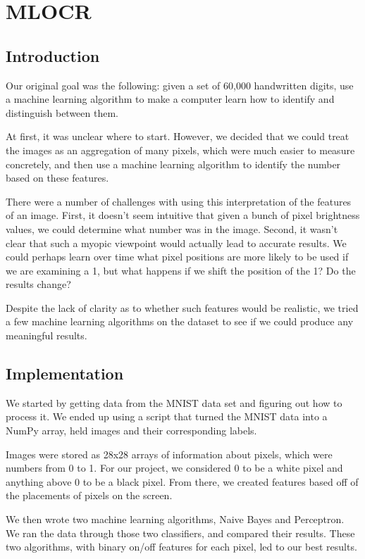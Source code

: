 \documentclass{article}
\theoremstyle{remark}
\begin{document}
	 \section*{MLOCR}
	\label*{Optical Character Recognition using Machine Learning}
	   \subsection*{Introduction}
     Our original goal was the following: given a set of 60,000 handwritten digits, use a machine learning algorithm to make a computer learn how to identify and distinguish between them.

     At first, it was unclear where to start. However, we decided that we could treat the images as an aggregation of many pixels, which were much easier to measure concretely, and then use a machine learning algorithm to identify the number based on these features.

     There were a number of challenges with using this interpretation of the features of an image. First, it doesn't seem intuitive that given a bunch of pixel brightness values, we could determine what number was in the image. Second, it wasn't clear that such a myopic viewpoint would actually lead to accurate results. We could perhaps learn over time what pixel positions are more likely to be used if we are examining a 1, but what happens if we shift the position of the 1? Do the results change?

     Despite the lack of clarity as to whether such features would be realistic, we tried a few machine learning algorithms on the dataset to see if we could produce any meaningful results.
     \subsection*{Implementation}
    	We started by getting data from the MNIST data set and figuring out how to process it. We ended up using a script that turned the MNIST data into a NumPy array, held images and their corresponding labels.

    	Images were stored as 28x28 arrays of information about pixels, which were numbers from 0 to 1. For our project, we considered 0 to be a white pixel and anything above 0 to be a black pixel. From there, we created features based off of the placements of pixels on the screen.

    	We then wrote two machine learning algorithms, Naive Bayes and Perceptron. We ran the data through those two classifiers, and compared their results. These two algorithms, with binary on/off features for each pixel, led to our best results.
\end{document}

